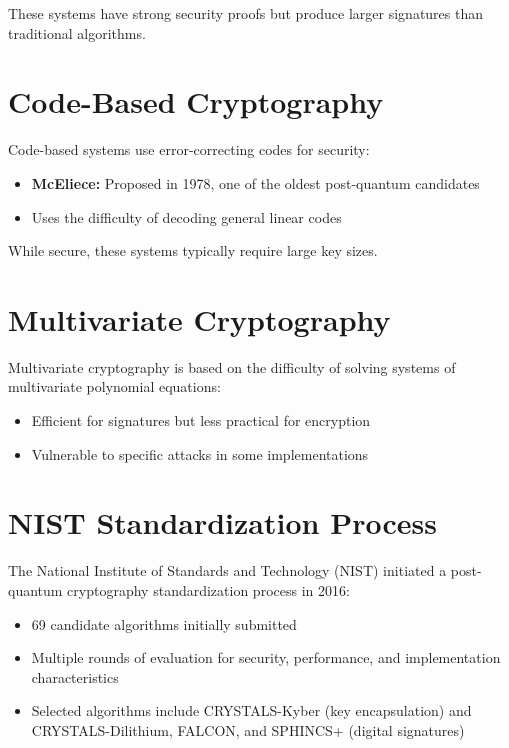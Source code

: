 These systems have strong security proofs but produce larger signatures than traditional algorithms.

\section{Code-Based Cryptography}
Code-based systems use error-correcting codes for security:

\begin{itemize}
    \item \textbf{McEliece:} Proposed in 1978, one of the oldest post-quantum candidates
    \item Uses the difficulty of decoding general linear codes
\end{itemize}

While secure, these systems typically require large key sizes.

\section{Multivariate Cryptography}
Multivariate cryptography is based on the difficulty of solving systems of multivariate polynomial equations:

\begin{itemize}
    \item Efficient for signatures but less practical for encryption
    \item Vulnerable to specific attacks in some implementations
\end{itemize}

\section{NIST Standardization Process}
The National Institute of Standards and Technology (NIST) initiated a post-quantum cryptography standardization process in 2016:

\begin{itemize}
    \item 69 candidate algorithms initially submitted
    \item Multiple rounds of evaluation for security, performance, and implementation characteristics
    \item Selected algorithms include CRYSTALS-Kyber (key encapsulation) and CRYSTALS-Dilithium, FALCON, and SPHINCS+ (digital signatures)
\end{itemize}


